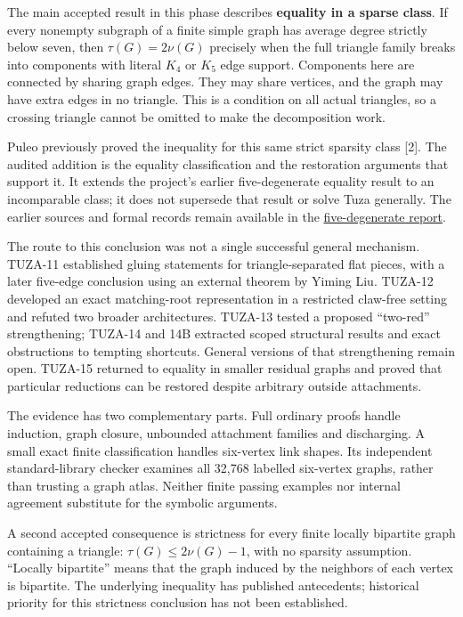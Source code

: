 \documentclass[11pt,a4paper]{article}
\begin{document}
The main accepted result in this phase describes \textbf{equality in a sparse class}. If every nonempty subgraph of a finite simple graph has average degree strictly below seven, then \(\tau(G)=2\nu(G)\) precisely when the full triangle family breaks into components with literal \(K_4\) or \(K_5\) edge support. Components here are connected by sharing graph edges. They may share vertices, and the graph may have extra edges in no triangle. This is a condition on all actual triangles, so a crossing triangle cannot be omitted to make the decomposition work.

Puleo previously proved the inequality for this same strict sparsity class {[}2{]}. The audited addition is the equality classification and the restoration arguments that support it. It extends the project's earlier five-degenerate equality result to an incomparable class; it does not supersede that result or solve Tuza generally. The earlier sources and formal records remain available in the \href{https://github.com/pappa211/ai-math-experiments/blob/main/papers/tuza-five-degenerate/main.md}{five-degenerate report}.

The route to this conclusion was not a single successful general mechanism. TUZA-11 established gluing statements for triangle-separated flat pieces, with a later five-edge conclusion using an external theorem by Yiming Liu. TUZA-12 developed an exact matching-root representation in a restricted claw-free setting and refuted two broader architectures. TUZA-13 tested a proposed ``two-red'' strengthening; TUZA-14 and 14B extracted scoped structural results and exact obstructions to tempting shortcuts. General versions of that strengthening remain open. TUZA-15 returned to equality in smaller residual graphs and proved that particular reductions can be restored despite arbitrary outside attachments.

The evidence has two complementary parts. Full ordinary proofs handle induction, graph closure, unbounded attachment families and discharging. A small exact finite classification handles six-vertex link shapes. Its independent standard-library checker examines all 32,768 labelled six-vertex graphs, rather than trusting a graph atlas. Neither finite passing examples nor internal agreement substitute for the symbolic arguments.

A second accepted consequence is strictness for every finite locally bipartite graph containing a triangle: \(\tau(G)\le2\nu(G)-1\), with no sparsity assumption. ``Locally bipartite'' means that the graph induced by the neighbors of each vertex is bipartite. The underlying inequality has published antecedents; historical priority for this strictness conclusion has not been established.
\end{document}
